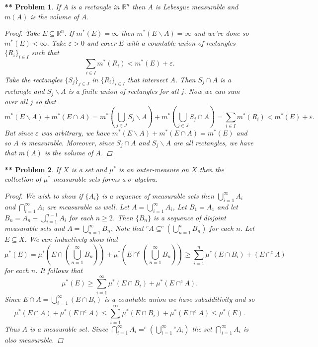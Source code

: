 \documentclass{article}
\newtheorem{**}{** Problem}
\begin{document}
\begin{flushleft}
\begin{**}
If $A$ is a rectangle in $\mathbb{R}^n$ then $A$ is Lebesgue measurable and $m(A)$ is the volume of $A$.
\begin{proof}
Take $E \subseteq \mathbb{R}^n$. If $m^*(E) = \infty$ then $m^*(E \backslash A) = \infty$ and we're done so $m^*(E) < \infty$. Take $\varepsilon > 0$ and cover $E$ with a countable union of rectangles $\{R_i\}_{i \in I}$ such that
\[
\sum_{i \in I} m^*(R_i) < m^*(E) + \varepsilon.
\]
Take the rectangles $\{S_j\}_{j \in J}$ in $\{R_i\}_{i \in I}$ that intersect $A$. Then $S_j \cap A$ is a rectangle and $S_j \backslash A$ is a finite union of rectangles for all $j$. Now we can sum over all $j$ so that
\[
m^*(E \backslash A) + m^*(E \cap A) = m^*(\bigcup_{j \in J} S_j \backslash A) + m^*(\bigcup_{j \in J} S_j \cap A) = \sum_{i \in I} m^*(R_i) < m^*(E) + \varepsilon.
\]
But since $\varepsilon$ was arbitrary, we have $m^*(E \backslash A) + m^*(E \cap A) = m^*(E)$ and so $A$ is measurable. Moreover, since $S_j \cap A$ and $S_j \backslash A$ are all rectangles, we have that $m(A)$ is the volume of $A$.
\end{proof}
\end{**}

\begin{**}
If $X$ is a set and $\mu^*$ is an outer-measure on $X$ then the collection of $\mu^*$ measurable sets forms a $\sigma$-algebra.
\begin{proof}
We wish to show if $\{A_i\}$ is a sequence of measurable sets then $\bigcup_{i=1}^{\infty} A_i$ and $\bigcap_{i=1}^{\infty} A_i$ are measurable as well. Let $A = \bigcup_{i=1}^{\infty} A_i$, Let $B_1 = A_1$ and let $B_n = A_n - \bigcup_{i=1}^{n-1} A_i$ for each $n \geq 2$. Then $\{B_n\}$ is a sequence of disjoint measurable sets and $A = \bigcup_{n=1}^{\infty} B_n$. Note that $^c A \subseteq ^c \left (\bigcup_{n=1}^{n} B_n \right )$ for each $n$. Let $E \subseteq X$. We can inductively show that
\[
\mu^*(E) = \mu^* \left ( E \cap \left (\bigcup_{n=1}^{\infty} B_n \right ) \right ) + \mu^* \left ( E \cap ^c\left (\bigcup_{n=1}^{\infty} B_n \right ) \right ) \geq \sum_{i=1}^{n} \mu^* (E \cap B_i) + (E \cap ^cA)
\]
for each $n$. It follows that
\[
\mu^*(E) \geq \sum_{i=1}^{\infty} \mu^* (E \cap B_i) + \mu^* (E \cap ^c A).
\]
Since $E \cap A = \bigcup_{i=1}^{\infty} (E \cap B_i)$ is a countable union we have subadditivity and so
\[
\mu^*(E \cap A) + \mu^* (E \cap ^c A) \leq \sum_{i=1}^{\infty} \mu^* (E \cap B_i) + \mu^* (E \cap ^c A) \leq \mu^*(E).
\]
Thus $A$ is a measurable set. Since $\bigcap_{i=1}^{\infty} A_i = ^c \left ( \bigcup_{i=1}^{\infty} {^c A_i} \right )$ the set $\bigcap_{i=1}^{\infty} A_i$ is also measurable.
\end{proof}
\end{**}


\end{flushleft}
\end{document}
